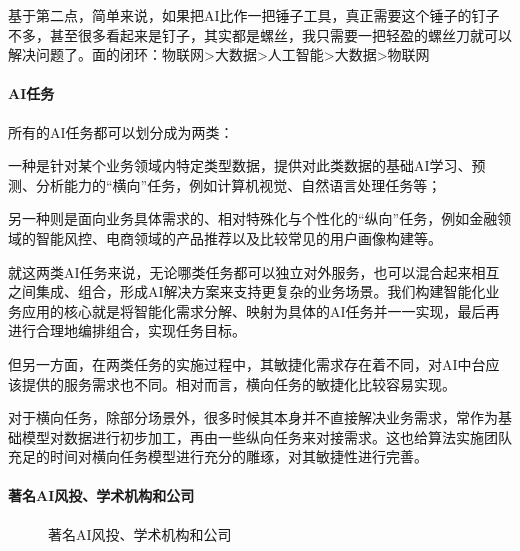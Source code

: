 \documentclass[letterpaper,11pt,english]{sphinxmanual}
\begin{document}
基于第二点，简单来说，如果把AI比作一把锤子工具，真正需要这个锤子的钉子不多，甚至很多看起来是钉子，其实都是螺丝，我只需要一把轻盈的螺丝刀就可以解决问题了。面的闭环：物联网\sphinxhyphen{}>大数据\sphinxhyphen{}>人工智能\sphinxhyphen{}>大数据\sphinxhyphen{}>物联网


\paragraph{AI任务}
\label{\detokenize{chapter_introduction/AI:id28}}
所有的AI任务都可以划分成为两类：%
\begin{footnote}[200]\sphinxAtStartFootnote
{}
%
\end{footnote}

一种是针对某个业务领域内特定类型数据，提供对此类数据的基础AI学习、预测、分析能力的“横向”任务，例如计算机视觉、自然语言处理任务等；

另一种则是面向业务具体需求的、相对特殊化与个性化的“纵向”任务，例如金融领域的智能风控、电商领域的产品推荐以及比较常见的用户画像构建等。

就这两类AI任务来说，无论哪类任务都可以独立对外服务，也可以混合起来相互之间集成、组合，形成AI解决方案来支持更复杂的业务场景。我们构建智能化业务应用的核心就是将智能化需求分解、映射为具体的AI任务并一一实现，最后再进行合理地编排组合，实现任务目标。

但另一方面，在两类任务的实施过程中，其敏捷化需求存在着不同，对AI中台应该提供的服务需求也不同。相对而言，横向任务的敏捷化比较容易实现。

对于横向任务，除部分场景外，很多时候其本身并不直接解决业务需求，常作为基础模型对数据进行初步加工，再由一些纵向任务来对接需求。这也给算法实施团队充足的时间对横向任务模型进行充分的雕琢，对其敏捷性进行完善。


\paragraph{著名AI风投、学术机构和公司}
\label{\detokenize{chapter_introduction/AI:id29}}
\begin{figure}[H]
\centering
\capstart

\noindent{}
\caption{著名AI风投、学术机构和公司\sphinxfootnotemark[201]}\label{\detokenize{chapter_introduction/AI:id40}}\end{figure}
%
\begin{footnotetext}[201]\sphinxAtStartFootnote
{}
%
\end{footnotetext}\ignorespaces 
\end{document}
